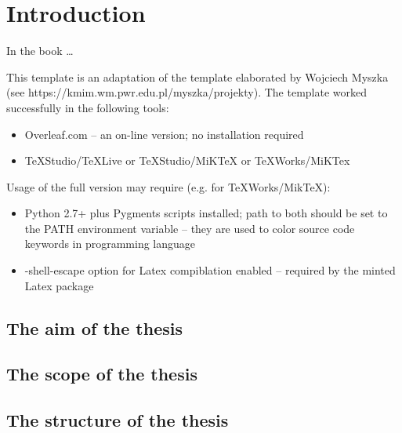 
\chapter{Introduction}

In the book \cite{docker_compose_reference} \dots

This template is an adaptation of the template elaborated by Wojciech Myszka (see https://kmim.wm.pwr.edu.pl/myszka/projekty).
The template worked successfully in the following tools:
\begin{itemize}
    \item Overleaf.com -- an on-line version; no installation required
    \item TeXStudio/TeXLive or TeXStudio/MiKTeX or TeXWorks/MiKTex
\end{itemize}

Usage of the full version may require (e.g. for TeXWorks/MikTeX):
\begin{itemize}
    \item Python 2.7+ plus Pygments scripts installed; path to both should be set to the PATH environment variable -- they are used to color source code keywords in programming language
    \item -shell-escape option for Latex compiblation enabled -- required by the minted Latex package
\end{itemize}

\section{The aim of the thesis}

\lipsum[1]

\section{The scope of the thesis}

\lipsum[1]

\section{The structure of the thesis}

\lipsum[1]